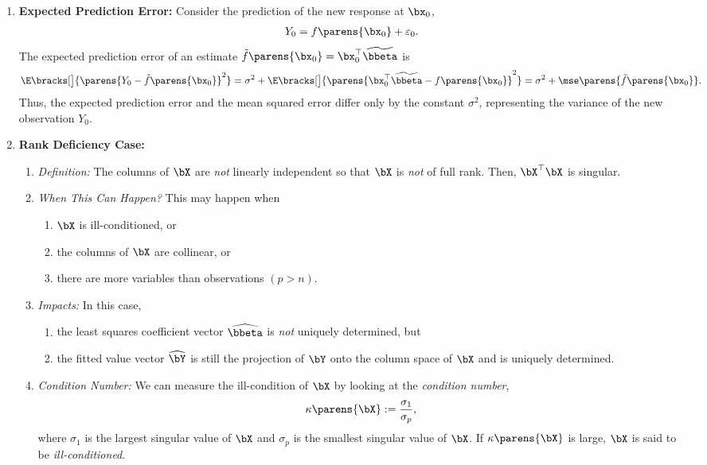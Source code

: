 \documentclass[12pt]{article}
\begin{document}
\begin{enumerate}[label=\textbf{\arabic*.}]
	\item \textbf{Expected Prediction Error:} Consider the prediction of the new response at $\bx_0$, 
	\begin{align*}
		Y_0 = f \parens{\bx_0} + \varepsilon_0. 
	\end{align*}
	The expected prediction error of an estimate $\tilde{f} \parens{\bx_0} = \bx_0^\top \widetilde{\bbeta}$ is 
	\begin{align*}
		\E \bracks[\big]{\parens{Y_0 - \tilde{f} \parens{\bx_0}}^2} = \sigma^2 + \E \bracks[\big]{\parens{\bx_0^\top \widetilde{\bbeta} - f \parens{\bx_0}}^2} = \sigma^2 + \mse \parens{\tilde{f} \parens{\bx_0}}. 
	\end{align*}
	Thus, the expected prediction error and the mean squared error differ only by the constant $\sigma^2$, representing the variance of the new observation $Y_0$. 
	
	\item \textbf{Rank Deficiency Case:} 
	
	\begin{enumerate}
		\item \textit{Definition:} The columns of $\bX$ are \emph{not} linearly independent so that $\bX$ is \emph{not} of full rank. Then, $\bX^\top \bX$ is singular. 
		
		\item \textit{When This Can Happen?} This may happen when 
		\begin{enumerate}
			\item $\bX$ is ill-conditioned, or 
			\item the columns of $\bX$ are collinear, or 
			\item there are more variables than observations $(p > n)$. 
		\end{enumerate}

		\item \textit{Impacts:} In this case, 
		\begin{enumerate}
			\item the least squares coefficient vector $\widehat{\bbeta}$ is \emph{not} uniquely determined, but
			\item the fitted value vector $\widehat{\bY}$ is still the projection of $\bY$ onto the column space of $\bX$ and is uniquely determined. 
		\end{enumerate}
		
		\item \textit{Condition Number:} We can measure the ill-condition of $\bX$ by looking at the \textit{condition number}, 
		\begin{align*}
			\kappa \parens{\bX} := \frac{\sigma_1}{\sigma_p}, 
		\end{align*}
		where $\sigma_1$ is the largest singular value of $\bX$ and $\sigma_p$ is the smallest singular value of $\bX$. If $\kappa \parens{\bX}$ is large, $\bX$ is said to be \emph{ill-conditioned}. 
		

\end{enumerate}
\end{enumerate}
\end{document}

